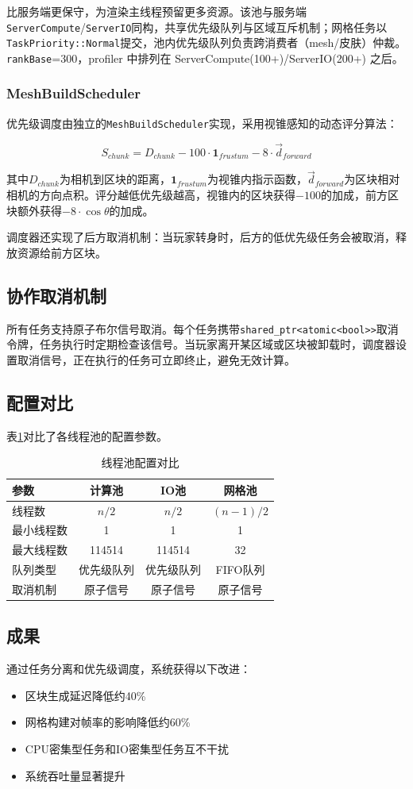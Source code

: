 比服务端更保守，为渲染主线程预留更多资源。该池与服务端\texttt{ServerCompute}/\texttt{ServerIO}同构，共享优先级队列与区域互斥机制；网格任务以\texttt{TaskPriority::Normal}提交，池内优先级队列负责跨消费者（mesh/皮肤）仲裁。\texttt{rankBase}=300，profiler 中排列在 ServerCompute(100+)/ServerIO(200+) 之后。

\subsubsection{MeshBuildScheduler}

优先级调度由独立的\texttt{MeshBuildScheduler}实现，采用视锥感知的动态评分算法：

\begin{equation}
S_{chunk} = D_{chunk} - 100 \cdot \mathbf{1}_{frustum} - 8 \cdot \vec{d}_{forward}
\end{equation}

其中$D_{chunk}$为相机到区块的距离，$\mathbf{1}_{frustum}$为视锥内指示函数，$\vec{d}_{forward}$为区块相对相机的方向点积。评分越低优先级越高，视锥内的区块获得$-100$的加成，前方区块额外获得$-8 \cdot \cos\theta$的加成。

调度器还实现了后方取消机制：当玩家转身时，后方的低优先级任务会被取消，释放资源给前方区块。

\subsection{协作取消机制}

所有任务支持原子布尔信号取消。每个任务携带\texttt{shared\_ptr<atomic<bool>>}取消令牌，任务执行时定期检查该信号。当玩家离开某区域或区块被卸载时，调度器设置取消信号，正在执行的任务可立即终止，避免无效计算。

\subsection{配置对比}

表\ref{tab:thread_pool_config}对比了各线程池的配置参数。

\begin{table}[h]
\centering
\caption{线程池配置对比}
\label{tab:thread_pool_config}
\begin{tabular}{lccc}
\toprule
\textbf{参数} & \textbf{计算池} & \textbf{IO池} & \textbf{网格池} \\
\midrule
线程数 & $n/2$ & $n/2$ & $(n-1)/2$ \\
最小线程数 & 1 & 1 & 1 \\
最大线程数 & 114514 & 114514 & 32 \\
队列类型 & 优先级队列 & 优先级队列 & FIFO队列 \\
取消机制 & 原子信号 & 原子信号 & 原子信号 \\
\bottomrule
\end{tabular}
\end{table}

\subsection{成果}

通过任务分离和优先级调度，系统获得以下改进：
\begin{itemize}
    \item 区块生成延迟降低约40\%
    \item 网格构建对帧率的影响降低约60\%
    \item CPU密集型任务和IO密集型任务互不干扰
    \item 系统吞吐量显著提升
\end{itemize}
